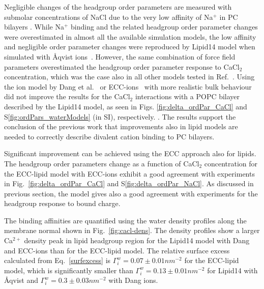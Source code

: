\documentclass[aip,jcp,twocolumn]{revtex4}
\begin{document}

Negligible changes of the headgroup order parameters are measured
with submolar concentrations of NaCl due to the very low affinity of Na$^+$
in PC bilayers \cite{akutsu81}. While Na$^+$ binding and the related 
headgroup order parameter changes were overestimated in
almost all the available simulation models, the low affinity
and negligible order parameter changes were reproduced by Lipid14 
model when simulated with \AA{}qvist ions~\cite{catte16}.
However, the same combination of force field parameters
overestimated the headgroup order parameter response to CaCl$_2$ 
concentration, which was the case also in all other models tested in
Ref.~.
Using the ion model by Dang et al.~\cite{smith94,chang1999,dang2006} or
ECC-ions~\cite{jungwirth17-new-paper-to-be-published, kohagen16, Pluharova2014}
with more realistic bulk behaviour did not improve the results
for the CaCl$_2$ interactions with a POPC bilayer described by the Lipid14 model, as seen 
in Figs. \ref{fig:delta_ordPar_CaCl} and S\ref{fig:ordPars_waterModels} (in SI), respectively.
.
The results support the conclusion of the previous work \cite{catte16}
that improvements also in lipid models are needed to 
correctly describe divalent cation binding to PC bilayers.

Significant improvement can be achieved using the ECC
approach also for lipids. The headgroup order parameters change
as a function of CaCl$_2$ concentration for the ECC-lipid model with ECC-ions
exhibit a good agreement with experiments in Fig.~\ref{fig:delta_ordPar_CaCl} and S\ref{fig:delta_ordPar_NaCl}.
As discussed in previous section, the model gives also
a good agreement with experiments for
the headgroup response to bound charge.


The binding affinities are quantified using
the water density profiles along the membrane normal shown
in Fig.~\ref{fig:cacl-dens}. The density profiles show
a larger Ca$^{2+}$ density peak in lipid headgroup region for
the Lipid14 model with Dang and ECC-ions than for the ECC-lipid model.
The relative surface excess calculated from Eq.~\ref{surfexcess} is 
$\Gamma_i^w = 0.07 \pm 0.01 nm^{-2}$ for the ECC-lipid model,
which is significantly smaller than $\Gamma_i^w = 0.13 \pm 0.01 nm^{-2}$ for
Lipid14 with \AA{}qvist and $\Gamma_i^w = 0.3 \pm 0.03 nm^{-2}$ with Dang ions.
\end{document}
